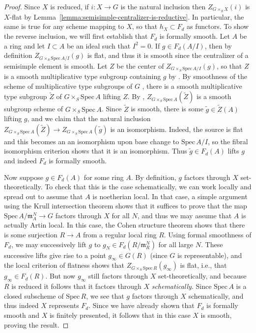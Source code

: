 \documentclass[11pt,reqno]{amsart}
\theoremstyle{definition}
\newcommand{\Spec}{\mathrm{Spec} \,}
\begin{document}
\begin{proof}
Since $X$ is reduced, if $i: X \to G$ is the natural inclusion then $Z_{G \times_S X}(i)$ is $X$-flat by Lemma~\ref{lemma:semisimple-centralizer-is-reductive}. In particular, the same is true for any scheme mapping to $X$, so that $h_X \subset F_d$ as functors. To show the reverse inclusion, we will first establish that $F_d$ is formally smooth. Let $A$ be a ring and let $I \subset A$ be an ideal such that $I^2 = 0$. If $g \in F_d(A/I)$, then by definition $Z_{G \times_S \Spec A/I}(g)$ is flat, and thus it is smooth since the centralizer of a semisimple element is smooth. Let $Z$ be the center of $Z_{G \times_S \Spec A/I}(g)$, so that $Z$ is a smooth multiplicative type subgroup containing $g$ by \cite[Cor.\ 3.2]{Integral-Springer}. By smoothness of the scheme of multiplicative type subgroups of $G$ \cite[Exp.\ XI, Thm.\ 4.1]{SGA3}, there is a smooth multiplicative type subgroup $\widetilde{Z}$ of $G \times_S \Spec A$ lifting $Z$. By \cite[Exp.\ XI, Cor.\ 5.3]{SGA3}, $Z_{G \times_S \Spec A}(\widetilde{Z})$ is a smooth subgroup scheme of $G \times_S \Spec A$. Since $\widetilde{Z}$ is smooth, there is some $\widetilde{g} \in \widetilde{Z}(A)$ lifting $g$, and we claim that the natural inclusion $Z_{G \times_S \Spec A}(\widetilde{Z}) \to Z_{G \times_S \Spec A}(\widetilde{g})$ is an isomorphism. Indeed, the source is flat and this becomes an an isomorphism upon base change to $\Spec A/I$, so the fibral isomorphism criterion shows that it is an isomorphism. Thus $\widetilde{g} \in F_d(A)$ lifts $g$ and indeed $F_d$ is formally smooth. \smallskip

Now suppose $g \in F_d(A)$ for some ring $A$. By definition, $g$ factors through $X$ set-theoretically. To check that this is the case schematically, we can work locally and spread out to assume that $A$ is noetherian local. In that case, a simple argument using the Krull intersection theorem shows that it suffices to prove that the map $\Spec A/\mathfrak{m}_A^N \to G$ factors through $X$ for all $N$, and thus we may assume that $A$ is actually Artin local. In this case, the Cohen structure theorem shows that there is some surjection $R \to A$ from a regular local ring $R$. Using formal smoothness of $F_d$, we may successively lift $g$ to $g_N \in F_d(R/\mathfrak{m}_R^N)$ for all large $N$. These successive lifts give rise to a point $g_\infty \in G(R)$ (since $G$ is representable), and the local criterion of flatness \cite[Thm.\ 22.1]{Matsumura} shows that $Z_{G \times_S \Spec R}(g_\infty)$ is flat, i.e., that $g_\infty \in F_d(R)$. But now $g_\infty$ still factors through $X$ set-theoretically, and because $R$ is reduced it follows that it factors through $X$ \textit{schematically}. Since $\Spec A$ is a closed subscheme of $\Spec R$, we see that $g$ factors through $X$ schematically, and thus indeed $X$ represents $F_d$. Since we have already shown that $F_d$ is formally smooth and $X$ is finitely presented, it follows that in this case $X$ is smooth, proving the result.
\end{proof}
\end{document}
